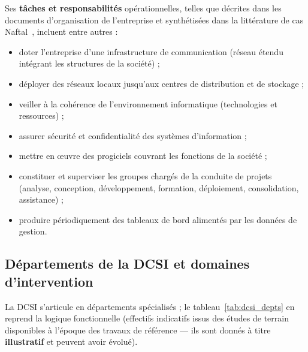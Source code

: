 Ses \textbf{tâches et responsabilités} opérationnelles, telles que décrites dans les documents
d'organisation de l'entreprise et synthétisées dans la littérature de cas Naftal~\cite{meghari2014},
incluent entre autres :
\begin{itemize}
    \item doter l'entreprise d'une infrastructure de communication (réseau étendu intégrant les
    structures de la société) ;
    \item déployer des réseaux locaux jusqu'aux centres de distribution et de stockage ;
    \item veiller à la cohérence de l'environnement informatique (technologies et ressources) ;
    \item assurer sécurité et confidentialité des systèmes d'information ;
    \item mettre en œuvre des progiciels couvrant les fonctions de la société ;
    \item constituer et superviser les groupes chargés de la conduite de projets (analyse,
    conception, développement, formation, déploiement, consolidation, assistance) ;
    \item produire périodiquement des tableaux de bord alimentés par les données de gestion.
\end{itemize}

\subsection{Départements de la DCSI et domaines d'intervention}
La DCSI s'articule en départements spécialisés ; le tableau~\ref{tab:dcsi_depts} en reprend la
logique fonctionnelle (effectifs indicatifs issus des études de terrain disponibles à l'époque des
travaux de référence — ils sont donnés à titre \textbf{illustratif} et peuvent avoir évolué).

